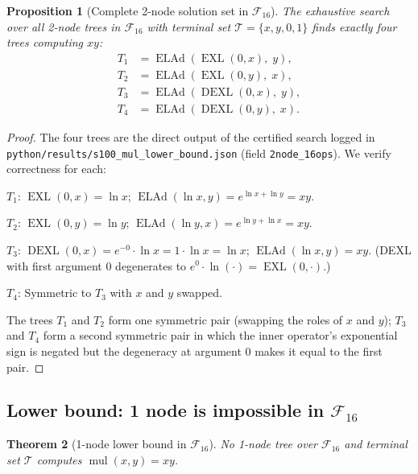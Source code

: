 \documentclass[12pt,a4paper]{article}
\newtheorem{theorem}{Theorem}[section]
\newtheorem{proposition}[theorem]{Proposition}
\theoremstyle{definition}
\newcommand{\EXL}{\operatorname{EXL}}
\newcommand{\ELAd}{\operatorname{ELAd}}
\newcommand{\DEXL}{\operatorname{DEXL}}
\newcommand{\mul}{\operatorname{mul}}
\begin{document}
\begin{proposition}[Complete 2-node solution set in $\mathcal{F}_{16}$]\label{prop:four}
The exhaustive search over all 2-node trees in $\mathcal{F}_{16}$ with
terminal set $\mathcal{T}=\{x,y,0,1\}$ finds exactly four trees computing $xy$:
\begin{align*}
  T_1 &= \ELAd(\EXL(0,x),\;y), \\
  T_2 &= \ELAd(\EXL(0,y),\;x), \\
  T_3 &= \ELAd(\DEXL(0,x),\;y), \\
  T_4 &= \ELAd(\DEXL(0,y),\;x).
\end{align*}
\end{proposition}

\begin{proof}
The four trees are the direct output of the certified search logged in
\texttt{python/results/s100\_mul\_lower\_bound.json} (field
\texttt{2node\_16ops}).  We verify correctness for each:

\medskip
\noindent$T_1$: $\EXL(0,x)=\ln x$; $\ELAd(\ln x,y)=e^{\ln x+\ln y}=xy$. \checkmark

\medskip
\noindent$T_2$: $\EXL(0,y)=\ln y$; $\ELAd(\ln y,x)=e^{\ln y+\ln x}=xy$. \checkmark

\medskip
\noindent$T_3$: $\DEXL(0,x)=e^{-0}\cdot\ln x = 1\cdot\ln x = \ln x$;
$\ELAd(\ln x,y)=xy$. \checkmark
(DEXL with first argument $0$ degenerates to $e^{0}\cdot\ln(\cdot)=\EXL(0,\cdot)$.)

\medskip
\noindent$T_4$: Symmetric to $T_3$ with $x$ and $y$ swapped. \checkmark

\medskip
\noindent The trees $T_1$ and $T_2$ form one symmetric pair (swapping the roles of
$x$ and $y$); $T_3$ and $T_4$ form a second symmetric pair in which the inner
operator's exponential sign is negated but the degeneracy at argument $0$
makes it equal to the first pair.
\end{proof}

\subsection{Lower bound: 1 node is impossible in $\mathcal{F}_{16}$}

\begin{theorem}[1-node lower bound in $\mathcal{F}_{16}$]\label{thm:lower1}
No 1-node tree over $\mathcal{F}_{16}$ and terminal set $\mathcal{T}$
computes $\mul(x,y)=xy$.
\end{theorem}
\end{document}
